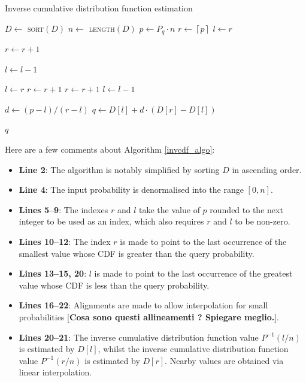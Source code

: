 \documentclass[10pt,final]{siamltex}
\begin{document}
\begin{algorithm}
  \caption{Inverse cumulative distribution function estimation}
  \label{invcdf_algo}
  \begin{algorithmic}[1]
    \State $D \gets$ \textsc{sort}$(D)$
    \State $n \gets$ \textsc{length}$(D)$
    \State $p \gets P_q \cdot n$
    \State $r \gets  \left \lceil{p}\right \rceil$
    \EndIf
    \State $l \gets r$

    \State $ r \gets r + 1$
    \EndWhile

    \State $l \gets l - 1$
    \EndWhile

    \State $l \gets r$
    \State $r \gets r+1$
    \State $r \gets r + 1$
    \EndWhile
    \Else
    \State $ l \gets l - 1$
    \EndIf

    \State $d \gets (p-l)/(r-l) $
    \State $q \gets D[l] + d \cdot (D[r]-D[l])$

    \State \Return $q$
    \EndFunction
  \end{algorithmic}
\end{algorithm}

Here are a few comments about Algorithm \ref{invcdf_algo}:
\begin{itemize}
  \item \textbf{Line 2}: The algorithm is notably simplified by sorting $D$ in ascending order.
  \item \textbf{Line 4}: The input probability is denormalised into the range $[0, n]$.
  \item \textbf{Lines 5--9}: The indexes $r$ and $l$ take the value of $p$ rounded to the next integer to be used as an index, which also requires $r$ and $l$ to be non-zero.
  \item \textbf{Lines 10--12}: The index $r$ is made to point to the last occurrence of the smallest value whose CDF is greater than the query probability.
  \item \textbf{Lines 13--15, 20}: $l$ is made to point to the last occurrence of the greatest value whose CDF is less than the query probability.
  \item \textbf{Lines 16--22}: Alignments are made to allow interpolation for small probabilities [{\bf\red Cosa sono questi allineamenti ? Spiegare meglio.}].
  \item \textbf{Lines 20--21}: The inverse cumulative distribution function value $P^{-1}(l/n)$ is estimated by $D[l]$, whilst the inverse cumulative distribution function value $P^{-1}(r/n)$ is estimated by $D[r]$. Nearby values are obtained via linear interpolation.
\end{itemize}
%
\end{document}
